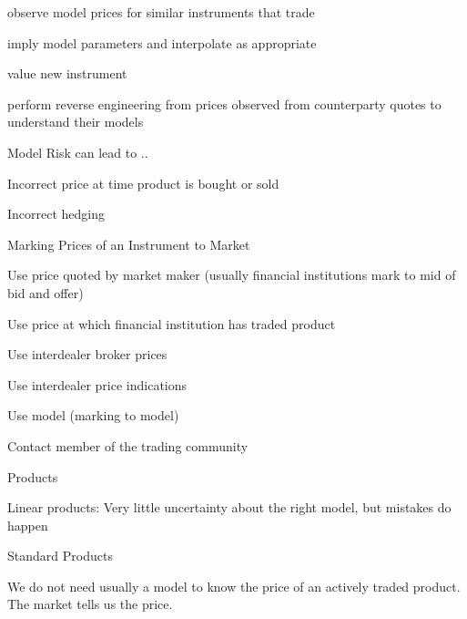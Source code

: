 	observe model prices for similar instruments that trade

	imply model parameters and interpolate as appropriate

	value new instrument

	perform reverse engineering from prices observed from counterparty quotes to understand their models






Model Risk can lead to ..






Incorrect price at time product is bought or sold

	Incorrect hedging






{Marking Prices of an Instrument to Market}






Use price quoted by market maker (usually financial institutions mark to mid of bid and offer)

	Use price at which financial institution has traded product

	Use interdealer broker prices

	Use interdealer price indications

	Use model (marking to model)

	Contact member of the trading community






{Products}






	Linear products: Very little uncertainty about the right model, but mistakes do happen

	Standard Products






	We do not need usually a model to know the price of an actively traded product. The market tells us the price.

